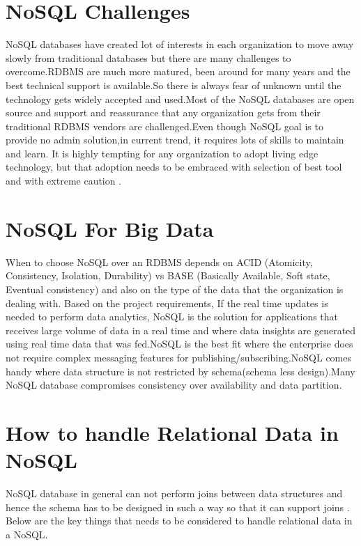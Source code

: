 \documentclass[sigconf]{acmart}
\begin{document}
\section{NoSQL Challenges}

NoSQL databases have created lot of interests in each organization to move away slowly from traditional databases but there are many challenges to overcome.RDBMS are much more matured, been around for many years and the best technical support is available.So there is always fear of unknown until the technology gets widely accepted and used.Most of the NoSQL databases are open source and support and reassurance that any organization gets from their traditional RDBMS vendors are challenged.Even though NoSQL goal is to provide no admin solution,in current trend, it requires lots of skills to maintain and learn. It is highly tempting for any organization to adopt living edge technology, but that adoption needs to be embraced with selection of best tool and with extreme caution \cite{dbkumar}.

\section{NoSQL For Big Data}

When to choose NoSQL over an RDBMS depends on ACID (Atomicity, Consistency, Isolation, Durability) vs BASE (Basically Available, Soft state, Eventual consistency) and also on the type of the data that the organization is dealing with. Based on the project requirements, If the real time updates is needed to perform data analytics, NoSQL is the solution for applications that receives large volume of data in a real time and where data insights are generated using real time data that was fed.NoSQL is the best fit where the enterprise does not require complex messaging features for publishing/subscribing.NoSQL comes handy where data structure is not restricted by schema(schema less design).Many NoSQL database compromises consistency over availability and data partition.

\section{How to handle Relational Data in NoSQL}

NoSQL database in general can not perform joins between data structures and hence the schema has to be designed in such a way so that it can support joins \cite{vish}. Below are the key things that needs to be considered to handle relational data in a NoSQL.
\end{document}
